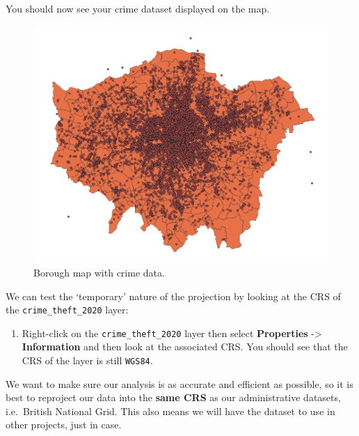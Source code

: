 \documentclass[
]{book}
\providecommand{\tightlist}{%
  \setlength{\itemsep}{0pt}\setlength{\parskip}{0pt}}
\begin{document}
You should now see your crime dataset displayed on the map.

\begin{figure}

{\centering \includegraphics[width=0.9\linewidth]{images/w03/crime_unproj} 

}

\caption{Borough map with crime data.}\label{fig:03-borough-crime}
\end{figure}

We can test the `temporary' nature of the projection by looking at the CRS of the \texttt{crime\_theft\_2020} layer:

\begin{enumerate}
\def\labelenumi{\arabic{enumi}.}
\setcounter{enumi}{3}
\tightlist
\item
  Right-click on the \texttt{crime\_theft\_2020} layer then select \textbf{Properties} -\textgreater{} \textbf{Information} and then look at the associated CRS. You should see that the CRS of the layer is still \texttt{WGS84}.
\end{enumerate}

We want to make sure our analysis is as accurate and efficient as possible, so it is best to reproject our data into the \textbf{same CRS} as our administrative datasets, i.e.~British National Grid. This also means we will have the dataset to use in other projects, just in case.
\end{document}

